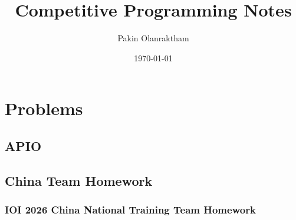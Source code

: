 \documentclass[12pt,a4paper]{report}
\begin{document}
\title{Competitive Programming Notes}
\author{Pakin Olanraktham}
\date{\today}

\maketitle

\newpage

\tableofcontents
\newpage



\chapter{Problems}

\section{APIO}



\break

\section{China Team Homework}

\subsection{IOI 2026 China National Training Team Homework}









\end{document}
